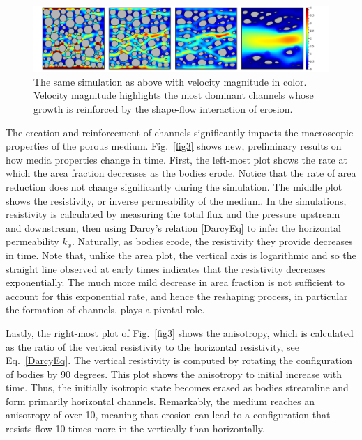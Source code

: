 \documentclass[11pt]{article}
\begin{document}
\begin{figure}%
\begin{center}
\includegraphics[width = 0.99 \textwidth]{./figs/80circ8vel.pdf}
\caption{\label{fig2} The same simulation as above with velocity magnitude in color. Velocity magnitude highlights the most dominant channels whose growth is reinforced by the shape-flow interaction of erosion.}
\end{center}
\end{figure}
 

The creation and reinforcement of channels significantly impacts the macroscopic properties of the porous medium. Fig.~\ref{fig3} shows new, preliminary results on how media properties change in time. First, the left-most plot shows the rate at which the area fraction decreases as the bodies erode. 
Notice that the rate of area reduction does not change significantly during the simulation. The middle plot shows the resistivity, or inverse permeability of the medium. In the simulations, resistivity is calculated by measuring the total flux and the pressure upstream and downstream, then using Darcy's relation \eqref{DarcyEq} to infer the horizontal permeability $k_x$. Naturally, as bodies erode, the resistivity they provide decreases in time. Note that, unlike the area plot, the vertical axis is logarithmic and so the straight line observed at early times indicates that the resistivity decreases exponentially. The much more mild decrease in area fraction is not sufficient to account for this exponential rate, and hence the reshaping process, in particular the formation of channels, plays a pivotal role.

Lastly, the right-most plot of Fig.~\ref{fig3} shows the anisotropy, which is calculated as the ratio of the vertical resistivity to the horizontal resistivity, see Eq.~\eqref{DarcyEq}. The vertical resistivity is computed by rotating the configuration of bodies by 90 degrees. This plot shows the anisotropy to initial increase with time. Thus, the initially isotropic state becomes erased as bodies streamline and form primarily horizontal channels. Remarkably, the medium reaches an anisotropy of over 10, meaning that erosion can lead to a configuration that resists flow 10 times more in the vertically than horizontally.
\end{document}
